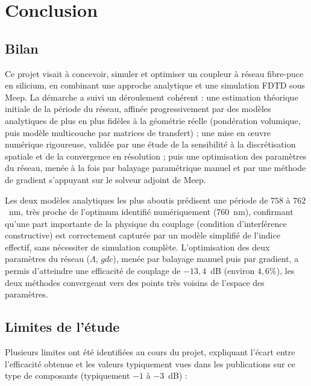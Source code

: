 \documentclass[a4paper,11pt]{report}
\begin{document}
\chapter{Conclusion}

\section{Bilan}

Ce projet visait à concevoir, simuler et optimiser un coupleur à réseau fibre-puce en silicium, en combinant une approche analytique et une simulation FDTD sous Meep. La démarche a suivi un déroulement cohérent : une estimation théorique initiale de la période du réseau, affinée progressivement par des modèles analytiques de plus en plus fidèles à la géométrie réelle (pondération volumique, puis modèle multicouche par matrices de transfert) ; une mise en œuvre numérique rigoureuse, validée par une étude de la sensibilité à la discrétisation spatiale et de la convergence en résolution ; puis une optimisation des paramètres du réseau, menée à la fois par balayage paramétrique manuel et par une méthode de gradient s'appuyant sur le solveur adjoint de Meep.

Les deux modèles analytiques les plus aboutis prédisent une période de $758$ à $762$~nm, très proche de l'optimum identifié numériquement ($760$~nm), confirmant qu'une part importante de la physique du couplage (condition d'interférence constructive) est correctement capturée par un modèle simplifié de l'indice effectif, sans nécessiter de simulation complète. L'optimisation des deux paramètres du réseau ($\Lambda$, $gdc$), menée par balayage manuel puis par gradient, a permis d'atteindre une efficacité de couplage de $-13{,}4$~dB (environ $4{,}6\%$), les deux méthodes convergeant vers des points très voisins de l'espace des paramètres.

\section{Limites de l'étude}

Plusieurs limites ont été identifiées au cours du projet, expliquant l'écart entre l'efficacité obtenue et les valeurs typiquement vues dans les publications sur ce type de composants (typiquement $-1$ à $-3$~dB) :
\end{document}
